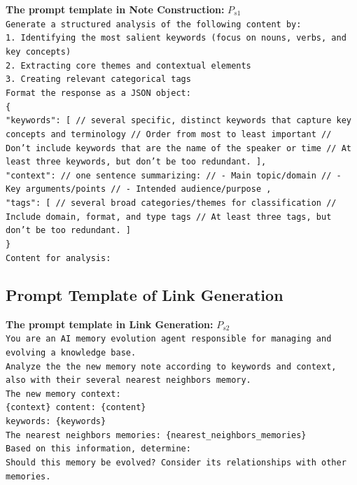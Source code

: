 \documentclass{article}
\begin{document}
\begin{tcolorbox}[colback=white!95!gray, colframe=black, width=1\textwidth, arc=4mm, boxrule=0.5mm]
\noindent \textbf{The prompt template in Note Construction:} $P_{s1}$\\  
\texttt{Generate a structured analysis of the following content by: \\
    1. Identifying the most salient keywords (focus on nouns, verbs, and key concepts) \\
    2. Extracting core themes and contextual elements \\
    3. Creating relevant categorical tags \\ 
    Format the response as a JSON object:\\ 
    \{\\ 
                "keywords": [
                    // several specific, distinct keywords that capture key concepts and terminology
                    // Order from most to least important
                    // Don't include keywords that are the name of the speaker or time
                    // At least three keywords, but don't be too redundant.
                ],\\
                "context": 
                    // one sentence summarizing:
                    // - Main topic/domain
                    // - Key arguments/points
                    // - Intended audience/purpose
                ,\\
                "tags": [
                    // several broad categories/themes for classification
                    // Include domain, format, and type tags
                    // At least three tags, but don't be too redundant.
                ] \\
            \} \\
            Content for analysis:} 
\end{tcolorbox}

\subsection{Prompt Template of Link Generation}
\begin{tcolorbox}[colback=white!95!gray, colframe=black, width=1\textwidth, arc=4mm, boxrule=0.5mm]
\noindent \textbf{The prompt template in Link Generation:} $P_{s2}$\\  
\texttt{You are an AI memory evolution agent responsible for managing and evolving a knowledge base.\\
Analyze the the new memory note according to keywords and context, also with their several nearest neighbors memory.\\
The new memory context: \\
\{context\}
content: \{content\} \\
keywords: \{keywords\} \\
The nearest neighbors memories:
\{nearest\_neighbors\_memories\} \\
Based on this information, determine:\\
Should this memory be evolved? Consider its relationships with other memories. } 
\end{tcolorbox}
\end{document}
